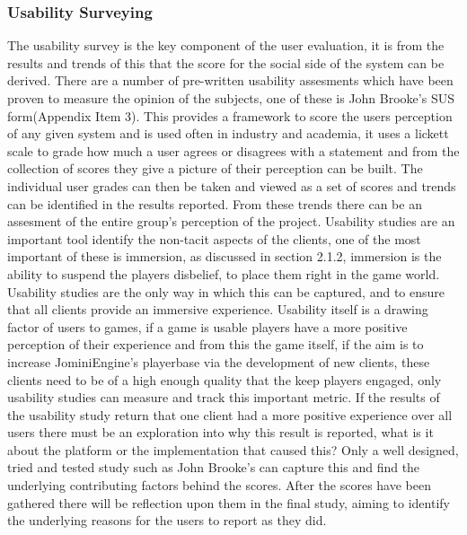 \documentclass{article}
\begin{document}
	\subsubsection{Usability Surveying}
	The usability survey is the key component of the user evaluation, it is from the results and trends of this that the score for the social side of the system can be derived. There are a number of pre-written usability assesments which have been proven to measure the opinion of the subjects, one of these is John Brooke's SUS form\cite{Brooke96sus:a}(Appendix Item 3). This provides a framework to score the users perception of any given system and is used often in industry and academia, it uses a lickett scale to grade how much a user agrees or disagrees with a statement and from the collection of scores they give a picture of their perception can be built. The individual user grades can then be taken and viewed as a set of scores and trends can be identified in the results reported. From these trends there can be an assesment of the entire group's perception of the project. Usability studies are an important tool identify the non-tacit aspects of the clients, one of the most important of these is immersion, as discussed in section 2.1.2, immersion is the ability to suspend the players disbelief, to place them right in the game world. Usability studies are the only way in which this can be captured, and to ensure that all clients provide an immersive experience. Usability itself is a drawing factor of users to games, if a game is usable players have a more positive perception of their experience and from this the game itself\cite{Christou:2012:EPP:2367616.2367630}, if the aim is to increase JominiEngine's playerbase via the development of new clients, these clients need to be of a high enough quality that the keep players engaged, only usability studies can measure and track this important metric. If the results of the usability study return that one client had a more positive experience over all users there must be an exploration into why this result is reported, what is it about the platform or the implementation that caused this? Only a well designed, tried and tested study such as John Brooke's can capture this and find the underlying contributing factors behind the scores. After the scores have been gathered there will be reflection upon them in the final study, aiming to identify the underlying reasons for the users to report as they did.
\end{document}
